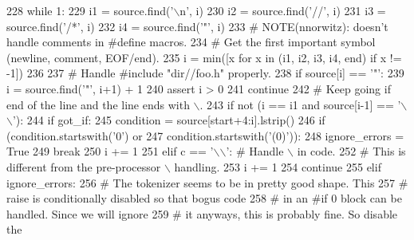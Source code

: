 \begin{DoxyCode}
{228             \textcolor{keywordflow}{while} 1:
229                 i1 = source.find(\textcolor{stringliteral}{'\(\backslash\)n'}, i)
230                 i2 = source.find(\textcolor{stringliteral}{'//'}, i)
231                 i3 = source.find(\textcolor{stringliteral}{'/*'}, i)
232                 i4 = source.find(\textcolor{stringliteral}{'"'}, i)
233                 \textcolor{comment}{# NOTE(nnorwitz): doesn't handle comments in #define macros.}
234                 \textcolor{comment}{# Get the first important symbol (newline, comment, EOF/end).}
235                 i = min([x \textcolor{keywordflow}{for} x \textcolor{keywordflow}{in} (i1, i2, i3, i4, end) \textcolor{keywordflow}{if} x != -1])
236 
237                 \textcolor{comment}{# Handle #include "dir//foo.h" properly.}
238                 \textcolor{keywordflow}{if} source[i] == \textcolor{stringliteral}{'"'}:
239                     i = source.find(\textcolor{stringliteral}{'"'}, i+1) + 1
240                     \textcolor{keyword}{assert} i > 0
241                     \textcolor{keywordflow}{continue}
242                 \textcolor{comment}{# Keep going if end of the line and the line ends with \(\backslash\).}
243                 \textcolor{keywordflow}{if} \textcolor{keywordflow}{not} (i == i1 \textcolor{keywordflow}{and} source[i-1] == \textcolor{stringliteral}{'\(\backslash\)\(\backslash\)'}):
244                     \textcolor{keywordflow}{if} got\_if:
245                         condition = source[start+4:i].lstrip()
246                         \textcolor{keywordflow}{if} (condition.startswith(\textcolor{stringliteral}{'0'}) \textcolor{keywordflow}{or}
247                             condition.startswith(\textcolor{stringliteral}{'(0)'})):
248                             ignore\_errors = \textcolor{keyword}{True}
249                     \textcolor{keywordflow}{break}
250                 i += 1
251         \textcolor{keywordflow}{elif} c == \textcolor{stringliteral}{'\(\backslash\)\(\backslash\)'}:                          \textcolor{comment}{# Handle \(\backslash\) in code.}
252             \textcolor{comment}{# This is different from the pre-processor \(\backslash\) handling.}
253             i += 1
254             \textcolor{keywordflow}{continue}
255         \textcolor{keywordflow}{elif} ignore\_errors:
256             \textcolor{comment}{# The tokenizer seems to be in pretty good shape.  This}
257             \textcolor{comment}{# raise is conditionally disabled so that bogus code}
258             \textcolor{comment}{# in an #if 0 block can be handled.  Since we will ignore}
259             \textcolor{comment}{# it anyways, this is probably fine.  So disable the}
}
\end{DoxyCode}

